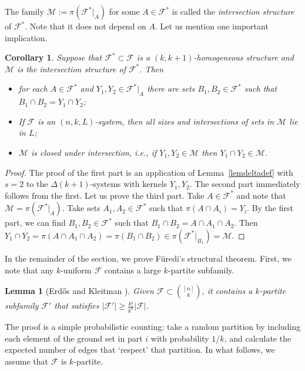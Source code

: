 \documentclass[graybox]{svmult}
\renewcommand{\ge}{\geqslant}
\newcommand{\ff}{\mathcal{F}}
\newcommand{\m}{\mathcal}
\newtheorem{lem}[thm]{Lemma}
\newtheorem{cor}[thm]{Corollary}
\begin{document}
The family $\m M:=\pi(\ff^*|_A)$ for some $A\in \ff^*$ is called the {\it intersection structure} of $\ff^*$. Note that it does not depend on $A$.  Let us mention one important implication.
\begin{cor}\label{corfur}
  Suppose that $\ff^*\subset \ff$ is a  $(k,k+1)$-homogeneous structure and $\m M$ is the intersection structure of $\ff^*$. Then
  \begin{itemize}
  \item for each $A\in \ff^*$ and $Y_1,Y_2\in \ff^*|_A$ there are sets  $B_1,B_2\in \ff^*$ such that $B_1\cap B_2 = Y_1\cap Y_2$;
  \item If $\ff$ is an $(n,k,L)$-system, then all sizes and intersections of sets in $\m M$ lie in $L$;
  \item $\m M$ is {\em closed under intersection}, i.e., if $Y_1,Y_2\in \m M$ then $Y_1\cap Y_2\in \m M$.
  \end{itemize}
\end{cor}
\begin{proof}
  The proof of the first part is an application of Lemma~\ref{lemdeltadef} with $s=2$ to the  $\Delta(k+1)$-systems with kernels  $Y_1,Y_2$. The second  part immediately follows from the first. Let us prove the third part. Take $A\in \ff^*$ and note that $\m M = \pi(\ff^*|_{A})$. Take sets $A_1,A_2\in \ff^*$ such that $\pi(A\cap A_i)=Y_i$. By the first part, we can find $B_1, B_2\in \ff^*$ such that $B_1\cap B_2 = A\cap A_1\cap A_2$. Then $Y_1\cap Y_2 =\pi(A\cap A_1\cap A_2) = \pi(B_1\cap B_2)\in \pi(\ff^*|_{B_1}) = \m M$. %
\end{proof}

In the remainder of the section, we prove F\"uredi's structural theorem. First, we note that any $k$-uniform $\ff$ contains a large $k$-partite subfamily.

\begin{lem}[Erd\H os and Kleitman \cite{EKl}] Given $\ff\subset {[n]\choose k}$, it contains a $k$-partite subfamily $\ff'$ that satisfies $|\ff'|\ge \frac{k!}{k^k}|\ff|$.
\end{lem}

The proof is a simple probabilistic counting: take a random partition by including each element of the ground set in part $i$ with probability $1/k$, and calculate the expected number of edges that `respect' that partition. In what follows, we assume that $\ff$ is $k$-partite.
\end{document}
